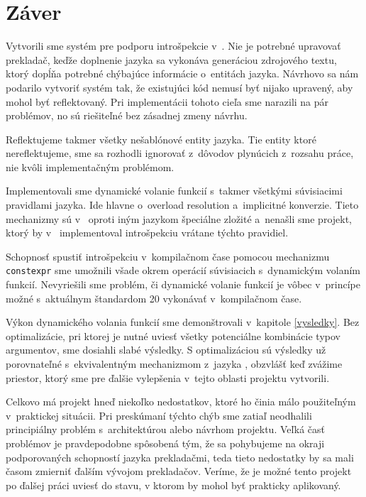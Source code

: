 \chapter{Záver}

Vytvorili sme systém pre podporu introšpekcie v~\Cpp{}. Nie je potrebné upravovať prekladač, keďže doplnenie jazyka sa vykonáva generáciou zdrojového textu, ktorý dopĺňa potrebné chýbajúce informácie o~entitách jazyka. Návrhovo sa nám podarilo vytvoriť systém tak, že existujúci kód nemusí byť nijako upravený, aby mohol byť reflektovaný. Pri implementácii tohoto cieľa sme narazili na pár problémov, no sú riešiteľné bez zásadnej zmeny návrhu.

Reflektujeme takmer všetky nešablónové entity jazyka. Tie entity ktoré nereflektujeme, sme sa rozhodli ignorovať z~dôvodov plynúcich z~rozsahu práce, nie kvôli implementačným problémom.

Implementovali sme dynamické volanie funkcií s~takmer všetkými súvisiacimi pravidlami jazyka. Ide hlavne o~overload resolution a~implicitné konverzie. Tieto mechanizmy sú v~\Cpp{} oproti iným jazykom špeciálne zložité a~nenašli sme projekt, ktorý by v~\Cpp{} implementoval introšpekciu vrátane týchto pravidiel.

Schopnosť spustiť introšpekciu v~kompilačnom čase pomocou mechanizmu \texttt{constexpr} sme umožnili všade okrem operácií súvisiacich s~dynamickým volaním funkcií. Nevyriešili sme problém, či dynamické volanie funkcií je vôbec v~princípe možné s~aktuálnym štandardom \Cpp{}20 vykonávať v~kompilačnom čase.

Výkon dynamického volania funkcií sme demonštrovali v~kapitole \ref{vysledky}. Bez optimalizácie, pri ktorej je nutné uviesť všetky potenciálne kombinácie typov argumentov, sme dosiahli slabé výsledky. S optimalizáciou sú výsledky už porovnateľné s~ekvivalentným mechanizmom z~jazyka \Csharp{}, obzvlášť keď zvážime priestor, ktorý sme pre ďalšie vylepšenia v~tejto oblasti projektu vytvorili.

Celkovo má projekt hneď niekoľko nedostatkov, ktoré ho činia málo použiteľným v~praktickej situácii. Pri preskúmaní týchto chýb sme zatiaľ neodhalili principiálny problém s~architektúrou alebo návrhom projektu. Veľká časť problémov je pravdepodobne spôsobená tým, že sa pohybujeme na okraji podporovaných schopností jazyka prekladačmi, teda tieto nedostatky by sa mali časom zmierniť ďalším vývojom prekladačov. Veríme, že je možné tento projekt po ďalšej práci uviesť do stavu, v ktorom by mohol byť prakticky aplikovaný.

